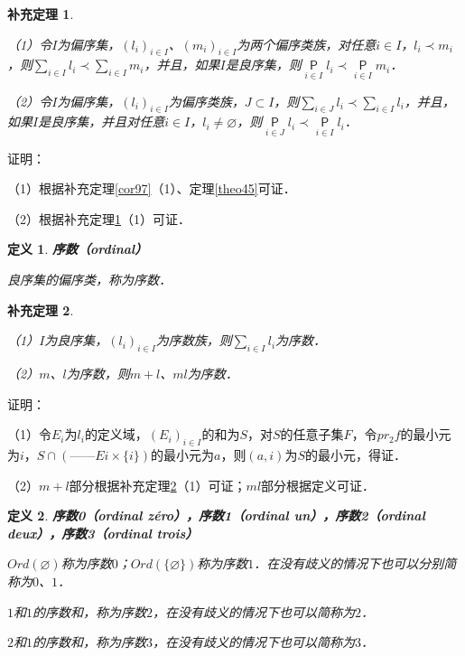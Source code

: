 \documentclass[12pt, a4paper, oneside]{book}
\newtheorem{cor}{补充定理}
\newtheorem{de}{定义}
\begin{document}
			\begin{cor}\label{cor246}
				\hfill\par
				（1）令$I$为偏序集，$(l_i)_{i\in I}$、$(m_i)_{i\in I}$为两个偏序类族，对任意$i\in I$，$l_i\prec m_i$，则$\sum\limits_{i\in I}l_i\prec \sum\limits_{i\in I}m_i$，并且，如果$I$是良序集，则$\mathop{\mathsf{P}}\limits_{i\in I}l_i\prec \mathop{\mathsf{P}}\limits_{i\in I}m_i$．
				\par
				（2）令$I$为偏序集，$(l_i)_{i\in I}$为偏序类族，$J\subset I$，则$\sum\limits_{i\in J}l_i\prec \sum\limits_{i\in I}l_i$，并且，如果$I$是良序集，并且对任意$i\in I$，$l_i\neq \varnothing$，则$\mathop{\mathsf{P}}\limits_{i\in J}l_i\prec \mathop{\mathsf{P}}\limits_{i\in I}l_i$．
			\end{cor}
			证明：
			\par
			（1）根据补充定理\ref{cor97}（1）、定理\ref{theo45}可证．
			\par
			（2）根据补充定理\ref{cor246}（1）可证．
									
			\begin{de}
				\textbf{序数（ordinal）}
				\par
				良序集的偏序类，称为序数．
			\end{de}
			
			\begin{cor}\label{cor247}
				\hfill\par
				（1）$I$为良序集，$(l_i)_{i\in I}$为序数族，则$\sum\limits_{i\in I}l_i$为序数．
				\par
				（2）$m$、$l$为序数，则$m+l$、$ml$为序数．
			\end{cor}
			证明：
			\par
			（1）令$E_i$为$l_i$的定义域，$(E_i)_{i\in I}$的和为$S$，对$S$的任意子集$F$，令$pr_2f$的最小元为$i$，$S\cap(——Ei\times \{i\})$的最小元为$a$，则$(a, i)$为$S$的最小元，得证．
			\par
			（2）$m+l$部分根据补充定理\ref{cor247}（1）可证；$ml$部分根据定义可证．
	
			\begin{de}
				\textbf{序数0（ordinal zéro），序数1（ordinal un），序数2（ordinal deux），序数3（ordinal trois）}
				\par
				$Ord(\varnothing)$称为序数$0$；$Ord (\{\varnothing\})$称为序数$1$．在没有歧义的情况下也可以分别简称为$0$、$1$．
				\par
				$1$和$1$的序数和，称为序数$2$，在没有歧义的情况下也可以简称为$2$．
				\par
				$2$和$1$的序数和，称为序数$3$，在没有歧义的情况下也可以简称为$3$．
			\end{de}
			
\end{document}
